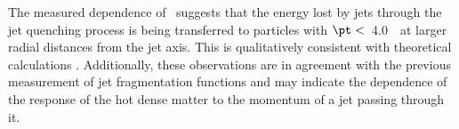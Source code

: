 The measured dependence of \RDptr\ suggests that the energy lost by jets through the jet quenching process is being transferred to particles with $\pt <$~4.0~\GeV\ at larger radial distances from the jet axis. This is qualitatively consistent with theoretical calculations \mbox{\cite{Blaizot:2014ula}}.
Additionally, these observations are in agreement with the previous measurement of jet fragmentation functions \cite{Chatrchyan:2014ava, Sirunyan:2018jqr, Aaboud:2017bzv, PhysRevC.98.024908} and may indicate the dependence of the response of the hot dense matter to the momentum of a jet passing through it. 


\FloatBarrier

